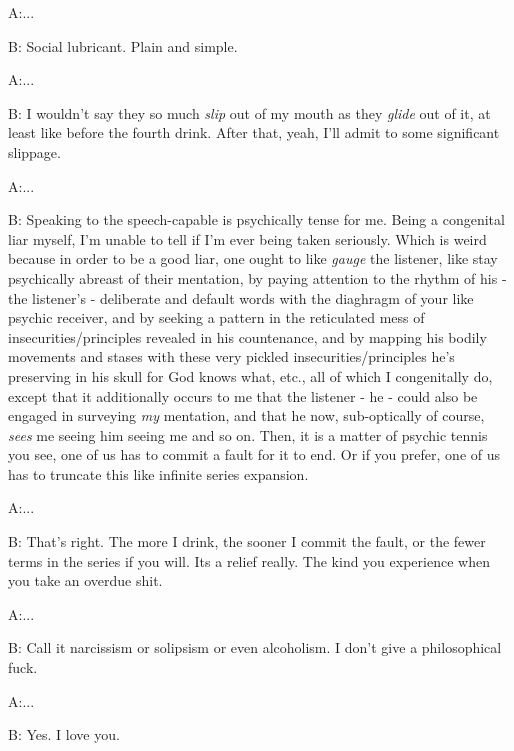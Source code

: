\documentclass{article}
\begin{document}
\newline

A:...

B: Social lubricant. Plain and simple.
\newline
\newline

A:...

B: I wouldn't say they so much \textit{slip} out of my mouth as they
\textit{glide} out of it, at least like before the fourth drink. After
that, yeah, I'll admit to some significant slippage. \newline
\newline
\newline

A:...

B: Speaking to the speech-capable is psychically tense for me. Being
a congenital liar myself, I'm unable to tell if I'm ever being taken
seriously. Which is weird because in order to be a good liar, one ought
to like \textit{gauge} the listener, like stay psychically abreast of
their mentation, by paying attention to the rhythm of his - the
listener's - deliberate and default words with the diaghragm of your
like psychic receiver, and by seeking a pattern in the reticulated mess
of insecurities/principles revealed in his countenance, and by mapping
his bodily movements and stases with these very pickled
insecurities/principles he's preserving in his skull for God knows what,
etc., all of which I congenitally do, except that it additionally occurs
to me that the listener - he - could also be engaged in surveying
\textit{my} mentation, and that he now, sub-optically of course,
\textit{sees} me seeing him seeing me and so on. Then, it is a matter of
psychic tennis you see, one of us has to commit a fault for it to end.
Or if you prefer, one of us has to truncate this like infinite series
expansion. \newline \newline

A:...

B: That's right. The more I drink, the sooner I commit the fault, or the
fewer terms in the series if you will. Its a relief really. The kind
you experience when you take an overdue shit.
\newline
\newline

A:...

B: Call it narcissism or solipsism or even alcoholism. I don't give
a philosophical fuck.
\newline
\newline

A:...

B: Yes. I love you.
\newline
\newline
\end{document}
